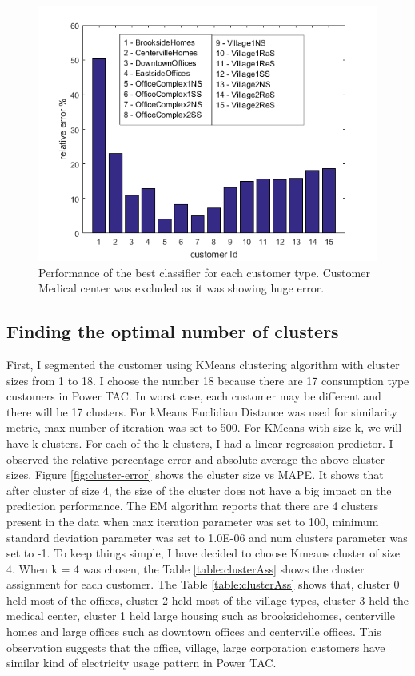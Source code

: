 \begin{figure}[h!]
  \includegraphics{relativeErrorIndivPredictor.png}
  \caption{Performance of the best classifier for each customer type. Customer Medical center was excluded as it was showing huge error. }
  \label{fig:indiv-cutomer-best-predictor-error}
\end{figure}


\subsection{Finding the optimal number of clusters} \label{results}

First, I segmented the customer using KMeans clustering algorithm with cluster sizes from 1 to 18. I choose the number 18 because there are 17 consumption type customers in Power TAC. In worst case, each customer may be different and there will be 17 clusters. For kMeans Euclidian Distance \cite{witten2005data} was used for similarity metric, max number of iteration \cite{witten2005data} was set to 500. For KMeans with size k, we will have k clusters. For each of the k clusters, I had a linear regression predictor. I observed the relative percentage error and absolute average the above cluster sizes. Figure \ref{fig:cluster-error} shows the cluster size vs MAPE. It shows that after cluster of size 4, the size of the cluster does not have a big impact on the prediction performance. The EM algorithm reports that there are 4 clusters present in the data when max iteration parameter \cite{witten2005data} was set to 100, minimum standard deviation parameter \cite{witten2005data} was set to 1.0E-06 and num clusters parameter \cite{witten2005data} was set to -1. To keep things simple, I have decided to choose Kmeans cluster of size 4.  When k = 4 was chosen, the Table \ref{table:clusterAss} shows the cluster assignment for each customer. The Table \ref{table:clusterAss} shows that, cluster 0 held most of the offices, cluster 2 held most of the village types, cluster 3 held the medical center, cluster 1 held large housing such as brooksidehomes, centerville homes and large offices such as downtown offices and centerville offices. This observation suggests that the office, village, large corporation customers have similar kind of electricity usage pattern in Power TAC.

